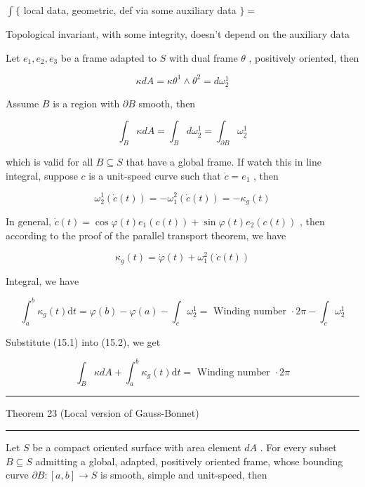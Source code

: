 \documentclass[lang=cn,a4paper,11pt,openany,twoside]{elegantbook}
\newcommand{\HRule}{\begin{center}\rule{0.9\linewidth}{0.2mm}\end{center}}
\begin{document}
\(\int \{\) local data, geometric, def via some auxiliary data \(\}  =\)

Topological invariant, with some integrity, doesn't depend on the auxiliary data

Let \({e}_{1},{e}_{2},{e}_{3}\) be a frame adapted to \(S\) with dual frame \(\theta\) , positively oriented, then

\[
{\kappa dA} = \kappa {\theta }^{1} \land  {\theta }^{2} = d{\omega }_{2}^{1}
\]

Assume \(B\) is a region with \(\partial B\) smooth, then

\[
{\int }_{B}{\kappa dA} = {\int }_{B}d{\omega }_{2}^{1} = {\int }_{\partial B}{\omega }_{2}^{1} \tag{15.1}
\]

which is valid for all \(B \subseteq  S\) that have a global frame. If watch this in line integral, suppose \(c\) is a unit-speed curve such that \(\dot{c} = {e}_{1}\) , then

\[
{\omega }_{2}^{1}\left( {\dot{c}\left( t\right) }\right)  =  - {\omega }_{1}^{2}\left( {\dot{c}\left( t\right) }\right)  =  - {\kappa }_{g}\left( t\right)
\]

In general, \(\dot{c}\left( t\right)  = \cos \varphi \left( t\right) {e}_{1}\left( {c\left( t\right) }\right)  + \sin \varphi \left( t\right) {e}_{2}\left( {c\left( t\right) }\right)\) , then according to the proof of the parallel transport theorem, we have

\[
{\kappa }_{g}\left( t\right)  = \dot{\varphi }\left( t\right)  + {\omega }_{1}^{2}\left( {\dot{c}\left( t\right) }\right)
\]

Integral, we have

\[
{\int }_{a}^{b}{\kappa }_{g}\left( t\right) \mathrm{d}t = \varphi \left( b\right)  - \varphi \left( a\right)  - {\int }_{c}{\omega }_{2}^{1} = \text{ Winding number } \cdot  {2\pi } - {\int }_{c}{\omega }_{2}^{1} \tag{15.2}
\]

Substitute (15.1) into (15.2), we get

\[
{\int }_{B}{\kappa dA} + {\int }_{a}^{b}{\kappa }_{g}\left( t\right) \mathrm{d}t = \text{ Winding number } \cdot  {2\pi }
\]

\HRule

Theorem 23 (Local version of Gauss-Bonnet)

\HRule

Let \(S\) be a compact oriented surface with area element \({dA}\) . For every subset \(B \subseteq  S\) admitting a global, adapted, positively oriented frame, whose bounding curve \(\partial B : \left\lbrack  {a,b}\right\rbrack   \rightarrow  S\) is smooth, simple and unit-speed, then
\end{document}
